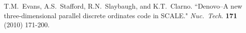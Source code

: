 \begin{bibsection}




\item T.M.\ Evans, A.S.\ Stafford, R.N.\ Slaybaugh, and K.T.\ Clarno. ``Denovo--A new three-dimensional parallel discrete ordinates code in SCALE." \textit{Nuc.\ Tech}. \textbf{171} (2010) 171-200.





\end{bibsection}
